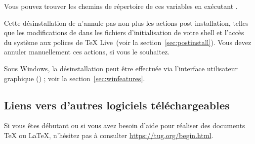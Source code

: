 \documentclass[german, english, french]{article}
\renewcommand{\TL}{\TeX{} Live\xspace}%
\begin{document}
\noindent Vous pouvez trouver les chemins de répertoire de ces variables en
exécutant .

Cette désinstallation de  n'annule pas non plus les actions
post-installation, telles que les modifications de  dans les
fichiers d'initialisation de votre shell et l'accès du système aux polices de
\TL\ (voir la section~\ref{sec:postinstall}). Vous devez annuler manuellement
ces actions, si vous le souhaitez.

Sous Windows, la désinstallation peut être effectuée via l'interface utilisateur
graphique (\GUI) ; voir la section~\ref{sec:winfeatures}.

\subsection{Liens vers d'autres logiciels téléchargeables}

Si vous êtes débutant ou si vous avez besoin d'aide pour réaliser des documents
\TeX{} ou \LaTeX{}, n'hésitez pas à consulter \url{https://tug.org/begin.html}.

\end{document}
